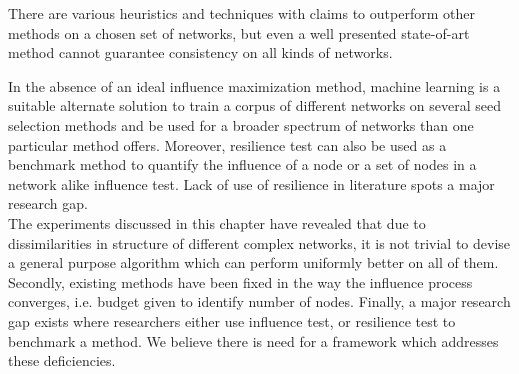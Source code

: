 	There are various heuristics and techniques with claims to outperform other methods on a chosen set of networks, but even a well presented state-of-art method cannot guarantee consistency on all kinds of networks.
	
	In the absence of an ideal influence maximization method, machine learning is a suitable alternate solution to train a corpus of different networks on several seed selection methods and be used for a broader spectrum of networks than one particular method offers. Moreover, resilience test can also be used as a benchmark method to quantify the influence of a node or a set of nodes in a network alike influence test. Lack of use of resilience in literature spots a major research gap. \\
	
The experiments discussed in this chapter have revealed that due to dissimilarities in structure of different complex networks, it is not trivial to devise a general purpose algorithm which can perform uniformly better on all of them. Secondly, existing methods have been fixed in the way the influence process converges, i.e. budget given to identify number of nodes. Finally, a major research gap exists where researchers either use influence test, or resilience test to benchmark a method. We believe there is need for a framework which addresses these deficiencies.

